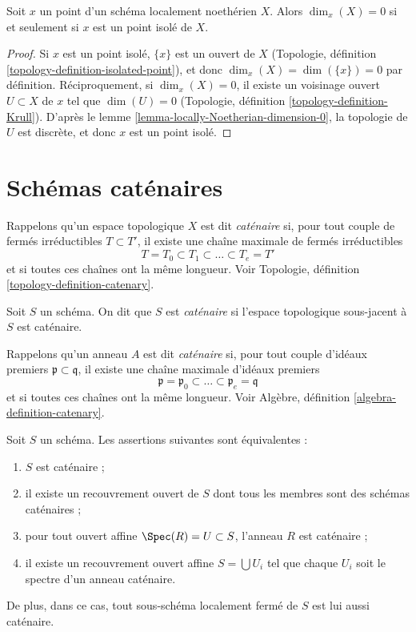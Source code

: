 \begin{lemma}
\label{lemma-isolated-dim-0-locally-noetherian}
Soit $x$ un point d'un schéma localement noethérien $X$.
Alors $\dim_x(X) = 0$ si et seulement si $x$ est un point isolé de $X$.
\end{lemma}

\begin{proof}
Si $x$ est un point isolé, $\{x\}$ est un ouvert de $X$
(Topologie, définition \ref{topology-definition-isolated-point}),
et donc $\dim_x(X) = \dim(\{x\}) = 0$ par définition. Réciproquement, si
$\dim_x(X) = 0$, il existe un voisinage ouvert $U \subset X$
de $x$ tel que $\dim(U) = 0$
(Topologie, définition \ref{topology-definition-Krull}).
D'après le lemme \ref{lemma-locally-Noetherian-dimension-0},
la topologie de $U$ est discrète, et donc
$x$ est un point isolé.
\end{proof}

\section{Schémas caténaires}
\label{section-catenary}

\noindent
Rappelons qu'un espace topologique $X$ est dit {\it caténaire} si,
pour tout couple de fermés irréductibles $T \subset T'$,
il existe une chaîne maximale de fermés irréductibles
$$
T = T_0 \subset T_1 \subset \ldots \subset T_e = T'
$$
et si toutes ces chaînes ont la même longueur. Voir
Topologie, définition \ref{topology-definition-catenary}.

\begin{definition}
\label{definition-catenary}
Soit $S$ un schéma. On dit que $S$ est {\it caténaire} si
l'espace topologique sous-jacent à $S$ est caténaire.
\end{definition}

\noindent
Rappelons qu'un anneau $A$ est dit {\it caténaire} si,
pour tout couple d'idéaux premiers $\mathfrak p \subset \mathfrak q$,
il existe une chaîne maximale d'idéaux premiers
$$
\mathfrak p =
\mathfrak p_0 \subset \ldots \subset \mathfrak p_e
= \mathfrak q
$$
et si toutes ces chaînes ont la même longueur. Voir
Algèbre, définition \ref{algebra-definition-catenary}.

\begin{lemma}
\label{lemma-catenary-local}
Soit $S$ un schéma. Les assertions suivantes sont équivalentes :
\begin{enumerate}
\item $S$ est caténaire ;
\item il existe un recouvrement ouvert de $S$ dont tous les membres sont
des schémas caténaires ;
\item pour tout ouvert affine $\Spec(R) = U \subset S$, l'anneau
$R$ est caténaire ;
\item il existe un recouvrement ouvert affine $S = \bigcup U_i$ tel
que chaque $U_i$ soit le spectre d'un anneau caténaire.
\end{enumerate}
De plus, dans ce cas, tout sous-schéma localement fermé de $S$ est lui aussi
caténaire.
\end{lemma}

